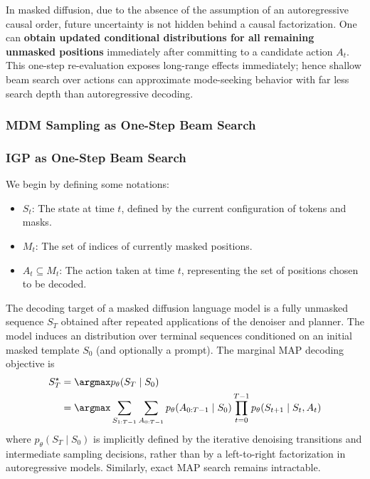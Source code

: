 In masked diffusion, due to the absence of the assumption of an autoregressive causal order, future uncertainty is not hidden behind a causal factorization. One can \textbf{obtain updated conditional distributions for all remaining unmasked positions} immediately after committing to a candidate action $A_t$. This one-step re-evaluation exposes long-range effects immediately; hence shallow beam search over actions can approximate mode-seeking behavior with far less search depth than autoregressive decoding.

\subsubsection{MDM Sampling as One-Step Beam Search}

\subsubsection{IGP as One-Step Beam Search}
We begin by defining some notations:
\begin{itemize}
    \item $S_t$: The state at time $t$, defined by the current configuration of tokens and masks.
    \item $M_t$: The set of indices of currently masked positions.
    \item $A_t \subseteq M_t$: The action taken at time $t$, representing the set of positions chosen to be decoded.
\end{itemize}

The decoding target of a masked diffusion language model is a fully unmasked sequence $S_T$ obtained after repeated applications of the denoiser and planner. The model induces an distribution over terminal sequences conditioned on an initial masked template $S_0$ (and optionally a prompt). The marginal MAP decoding objective is
\begin{align}
S_T^\star &= \argmax p_\theta(S_T \mid S_0) \\ &=\argmax \sum_{S_{1:T-1}}\sum_{A_{0:T-1}} p_\theta(A_{0:T-1} \mid S_0) \prod_{t=0}^{T-1} p_\theta (S_{t+1} \mid S_t, A_t)
\end{align}
where $p_\theta(S_T\mid S_0)$ is implicitly defined by the iterative denoising transitions and intermediate sampling decisions, rather than by a left-to-right factorization in autoregressive models. Similarly, exact MAP search remains intractable.

